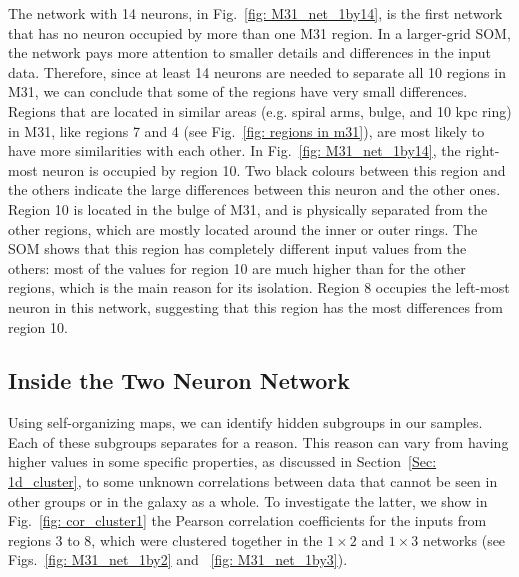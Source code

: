        The network with 14 neurons, in Fig.~\ref{fig: M31_net_1by14}, is the first network that has no neuron occupied by more than one M31 region.
        In a larger-grid SOM, the network pays more attention to smaller details and differences in the input data.
        Therefore, since at least 14 neurons are needed to separate all 10 regions in M31, we can conclude that some of the regions have very small differences.
        Regions that are located in similar areas (e.g. spiral arms, bulge, and 10 kpc ring) in M31, like regions 7 and 4 (see Fig.~\ref{fig: regions in m31}), are most likely to have more similarities with each other.
        In Fig.~\ref{fig: M31_net_1by14}, the right-most neuron is occupied by region 10.
        Two black colours between this region and the others indicate the large differences between this neuron and the other ones.
        Region 10 is located in the bulge of M31, and is physically separated from the other regions, which are mostly located around the inner or outer rings.
        The SOM shows that this region has completely different input values from the others: most of the values for region 10 are much higher than for the other regions, which is the main reason for its isolation.
        Region 8 occupies the left-most neuron in this network, suggesting that this region has the most differences from region 10.
        
    \subsection{Inside the Two Neuron Network}
        \label{sec: inside_the_2_neurons}
        Using self-organizing maps, we can identify hidden subgroups in our samples. 
        Each of these subgroups separates for a reason.
        This reason can vary from having higher values in some specific properties, as discussed in Section~\ref{Sec: 1d_cluster}, to some unknown correlations between data that cannot be seen in other groups or in the galaxy as a whole.
        To investigate the latter, we show in Fig.~\ref{fig: cor_cluster1} the Pearson correlation coefficients for the inputs from regions 3 to 8, which were clustered together in the $1\times2$ and $1\times3$ networks (see Figs.~\ref{fig: M31_net_1by2} and ~\ref{fig: M31_net_1by3}).
        
